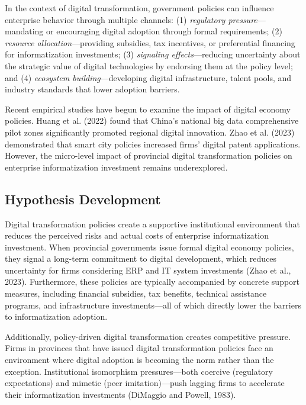 \documentclass[12pt]{article}
\begin{document}
In the context of digital transformation, government policies can influence enterprise behavior through multiple channels: (1) \textit{regulatory pressure}—mandating or encouraging digital adoption through formal requirements; (2) \textit{resource allocation}—providing subsidies, tax incentives, or preferential financing for informatization investments; (3) \textit{signaling effects}—reducing uncertainty about the strategic value of digital technologies by endorsing them at the policy level; and (4) \textit{ecosystem building}—developing digital infrastructure, talent pools, and industry standards that lower adoption barriers.

Recent empirical studies have begun to examine the impact of digital economy policies. Huang et al. (2022) found that China's national big data comprehensive pilot zones significantly promoted regional digital innovation. Zhao et al. (2023) demonstrated that smart city policies increased firms' digital patent applications. However, the micro-level impact of provincial digital transformation policies on enterprise informatization investment remains underexplored.

\subsection{Hypothesis Development}

Digital transformation policies create a supportive institutional environment that reduces the perceived risks and actual costs of enterprise informatization investment. When provincial governments issue formal digital economy policies, they signal a long-term commitment to digital development, which reduces uncertainty for firms considering ERP and IT system investments (Zhao et al., 2023). Furthermore, these policies are typically accompanied by concrete support measures, including financial subsidies, tax benefits, technical assistance programs, and infrastructure investments—all of which directly lower the barriers to informatization adoption.

Additionally, policy-driven digital transformation creates competitive pressure. Firms in provinces that have issued digital transformation policies face an environment where digital adoption is becoming the norm rather than the exception. Institutional isomorphism pressures—both coercive (regulatory expectations) and mimetic (peer imitation)—push lagging firms to accelerate their informatization investments (DiMaggio and Powell, 1983).
\end{document}
